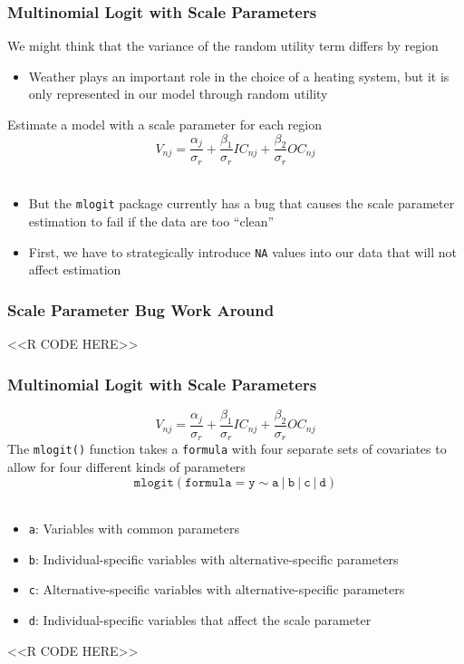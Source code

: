 \documentclass{beamer}
\begin{document}
\begin{frame}\frametitle{Multinomial Logit with Scale Parameters}
    We might think that the variance of the random utility term differs by region
    \begin{itemize}
    	\item Weather plays an important role in the choice of a heating system, but it is only represented in our model through random utility
    \end{itemize}
    \vspace{2ex}
    Estimate a model with a scale parameter for each region
    $$V_{nj} = \frac{\alpha_j}{\sigma_r} + \frac{\beta_1}{\sigma_r} IC_{nj} + \frac{\beta_2}{\sigma_r} OC_{nj}$$ \\
    \vspace{-1ex}
    \begin{itemize}
    	\item But the \texttt{mlogit} package currently has a bug that causes the scale parameter estimation to fail if the data are too ``clean''
    	\item First, we have to strategically introduce \texttt{NA} values into our data that will not affect estimation
    \end{itemize}
\end{frame}

\begin{frame}[fragile]\frametitle{Scale Parameter Bug Work Around}
    <<R CODE HERE>>
\end{frame}

\begin{frame}[fragile]\frametitle{Multinomial Logit with Scale Parameters}
    \vspace{-1ex}
    $$V_{nj} = \frac{\alpha_j}{\sigma_r} + \frac{\beta_1}{\sigma_r} IC_{nj} + \frac{\beta_2}{\sigma_r} OC_{nj}$$
    The \texttt{mlogit()} function takes a \texttt{formula} with four separate sets of covariates to allow for four different kinds of parameters
    $$\mathtt{mlogit(formula = y \sim a ~|~ b ~|~ c ~|~ d)}$$ \\
    \begin{itemize}
    	\item \texttt{a}: Variables with common parameters
    	\item \texttt{b}: Individual-specific variables with alternative-specific parameters
    	\item \texttt{c}: Alternative-specific variables with alternative-specific parameters
    	\item \texttt{d}: Individual-specific variables that affect the scale parameter
    \end{itemize}
    <<R CODE HERE>>
\end{frame}
\end{document}
